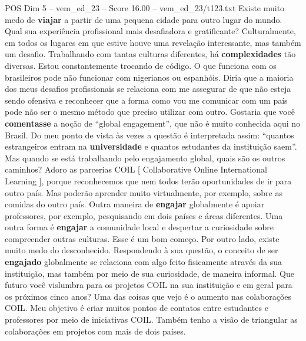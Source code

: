 \begin{textsample}{POS Dim 5 – vem\_ed\_23 – Score 16.00 – vem\_ed\_23/t123.txt}
Existe muito medo de \textbf{viajar} a partir de uma pequena cidade para outro lugar do mundo.
Qual sua experiência profissional mais desafiadora e gratificante?
Culturalmente, em todos os lugares em que estive houve uma revelação interessante, mas também um desafio.
Trabalhando com tantas culturas diferentes, há \textbf{complexidades} tão diversas.
Estou constantemente trocando de código.
O que funciona com os brasileiros pode não funcionar com nigerianos ou espanhóis.
Diria que a maioria dos meus desafios profissionais se relaciona com me assegurar de que não esteja sendo ofensiva e reconhecer que a forma como vou me comunicar com um país pode não ser o mesmo método que preciso utilizar com outro.
Gostaria que você \textbf{comentasse} a noção de “global engagement”, que não é muito conhecida aqui no Brasil.
Do meu ponto de vista às vezes a questão é interpretada assim: “quantos estrangeiros entram na \textbf{universidade} e quantos estudantes da instituição saem”.
Mas quando se está trabalhando pelo engajamento global, quais são os outros caminhos?
Adoro as parcerias COIL [ Collaborative Online International Learning ], porque reconhecemos que nem todos terão oportunidades de ir para outro país.
Mas poderão aprender muito virtualmente, por exemplo, sobre as comidas do outro país.
Outra maneira de \textbf{engajar} globalmente é apoiar professores, por exemplo, pesquisando em dois países e áreas diferentes.
Uma outra forma é \textbf{engajar} a comunidade local e despertar a curiosidade sobre compreender outras culturas.
Esse é um bom começo.
Por outro lado, existe muito medo do desconhecido.
Respondendo à sua questão, o conceito de ser \textbf{engajado} globalmente se relaciona com algo feito fisicamente através da sua instituição, mas também por meio de sua curiosidade, de maneira informal.
Que futuro você vislumbra para os projetos COIL na sua instituição e em geral para os próximos cinco anos?
Uma das coisas que vejo é o aumento nas colaborações COIL.
Meu objetivo é criar muitos pontos de contatos entre estudantes e professores por meio de iniciativas COIL.
Também tenho a visão de triangular as colaborações em projetos com mais de dois países.

\end{textsample}
